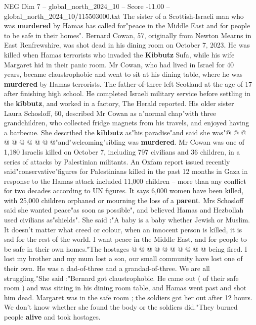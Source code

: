\begin{textsample}{NEG Dim 7 – global\_north\_2024\_10 – Score -11.00 – global\_north\_2024\_10/115503000.txt}  \label{ex:f7_neg_034}
The sister of a Scottish-Israeli man who was \textbf{murdered} by Hamas has called for"peace in the Middle East and for people to be safe in their homes".
Bernard Cowan, 57, originally from Newton Mearns in East Renfrewshire, was shot dead in his dining room on October 7, 2023.
He was killed when Hamas terrorists who invaded the \textbf{Kibbutz} Sufa, while his wife Margaret hid in their panic room.
Mr Cowan, who had lived in Israel for 40 years, became claustrophobic and went to sit at his dining table, where he was \textbf{murdered} by Hamas terrorists.
The father-of-three left Scotland at the age of 17 after finishing high school.
He completed Israeli military service before settling in the \textbf{kibbutz}, and worked in a factory, The Herald reported.
His older sister Laura Schosloff, 60, described Mr Cowan as a"normal chap"with three grandchildren, who collected fridge magnets from his travels, and enjoyed having a barbecue.
She described the \textbf{kibbutz} as"his paradise"and said she was"@ @ @ @ @ @ @ @ @ @"and"welcoming"sibling was \textbf{murdered}.
Mr Cowan was one of 1,180 Israelis killed on October 7, including 797 civilians and 36 children, in a series of attacks by Palestinian militants.
An Oxfam report issued recently said"conservative"figures for Palestinians killed in the past 12 months in Gaza in response to the Hamas attack included 11,000 children -- more than any conflict for two decades according to UN figures.
It says 6,000 women have been killed, with 25,000 children orphaned or mourning the loss of a \textbf{parent}.
Mrs Schosloff said she wanted peace"as soon as possible", and believed Hamas and Hezbollah used civilians as"shields".
She said :"A baby is a baby whether Jewish or Muslim.
It doesn't matter what creed or colour, when an innocent person is killed, it is sad for the rest of the world.
I want peace in the Middle East, and for people to be safe in their own homes."The hostages @ @ @ @ @ @ @ @ @ @ being fired.
I lost my brother and my mum lost a son, our small community have lost one of their own.
He was a dad-of-three and a grandad-of-three.
We are all struggling."She said :"Bernard got claustrophobic.
He came out ( of their safe room ) and was sitting in his dining room table, and Hamas went past and shot him dead.
Margaret was in the safe room ; the soldiers got her out after 12 hours.
We don't know whether she found the body or the soldiers did."They burned people \textbf{alive} and took hostages.

\end{textsample}
